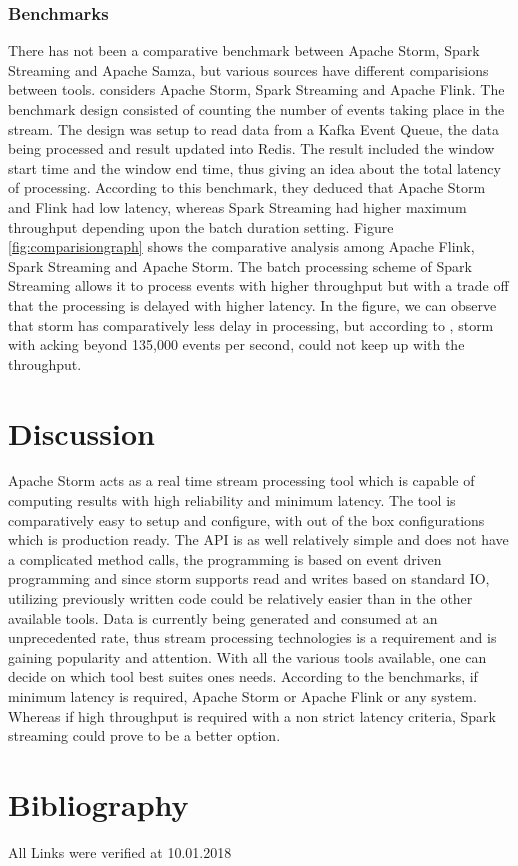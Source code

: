 \documentclass[runningheads,a4paper]{llncs}[2015/06/24]
\begin{document}
 \subsubsection{Benchmarks}
There has not been a comparative benchmark between Apache Storm, Spark Streaming and Apache Samza, but various sources have different comparisions between tools.  \cite{benchmark} considers Apache Storm, Spark Streaming and Apache Flink. The benchmark design consisted of counting the number of events taking place in the stream. The design was setup to read data from a Kafka Event Queue, the data being processed and result updated into Redis. The result included the window start time and the window end time, thus giving  an idea about the total latency of processing. According to this benchmark, they deduced that Apache Storm and Flink had low latency, whereas Spark Streaming had higher maximum throughput depending upon the batch duration setting. Figure \ref{fig:comparisiongraph} shows the comparative analysis among Apache Flink, Spark Streaming and Apache Storm. The batch processing scheme of Spark Streaming allows it to process events with higher throughput but with a trade off that the processing is delayed with higher latency. In the figure, we can observe that storm has comparatively less delay in processing, but according to \cite{benchmark}, storm with acking beyond 135,000 events per second, could not keep up with the throughput.
 
 \section{Discussion}
Apache Storm acts as a real time stream processing tool which is capable of computing results with high reliability and minimum latency. The tool is comparatively easy to setup and configure, with out of the box configurations which is production ready. The API is as well relatively simple and does not have a complicated method calls, the programming is based on event driven programming and since storm supports read and writes based on standard IO, utilizing previously written code could be relatively easier than in the other available tools. Data is currently being generated and consumed at an unprecedented rate, thus stream processing technologies is a requirement and is gaining popularity and attention. With all the various tools available, one can decide on which tool best suites ones needs. According to the benchmarks, if minimum latency is required, Apache Storm or Apache Flink or any system. Whereas if high throughput is required with a non strict latency criteria, Spark streaming could prove to be a better option.



\section{Bibliography}


All Links were verified at 10.01.2018
\end{document}
